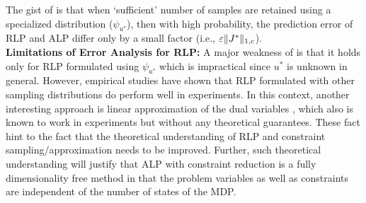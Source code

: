 The gist of  is that when `sufficient' number of samples are retained using a specialized distribution ($\psi_{u^*}$), then with high probability, the prediction error of RLP and ALP differ only by a small factor (i.e., $\varepsilon\|J^*\|_{1,c}$).\\
\textbf{Limitations of Error Analysis for RLP:} A major weakness of  is that it holds only for RLP formulated using $\psi_{u^*}$ which is impractical since $u^*$ is unknown in general. However, empirical studies \cite{ALP,CS,CST} have shown that RLP formulated with other sampling distributions do perform well in experiments. In this context, another interesting approach is linear approximation of the dual variables \cite{dolgov}, which also is known to work in experiments but without any theoretical guarantees. These fact hint to the fact that the theoretical understanding of RLP and constraint sampling/approximation needs to be improved. Further, such theoretical understanding will justify that ALP with constraint reduction is a fully dimensionality free method in that the problem variables as well as constraints are independent of the number of states of the MDP.
\begin{comment}
The Generalized Reduced Linear Program is given as:
\begin{align}\label{grlp}
\begin{split}
&\text{GRLP:~}\underset{r\in \N\subset R^k}{\min}\, \, c^\top \Phi r\,\,\,\,\\
&  \,W^\top E\Phi r\geq W^\top H \Phi r.
\end{split}
\end{align}
\end{comment}
